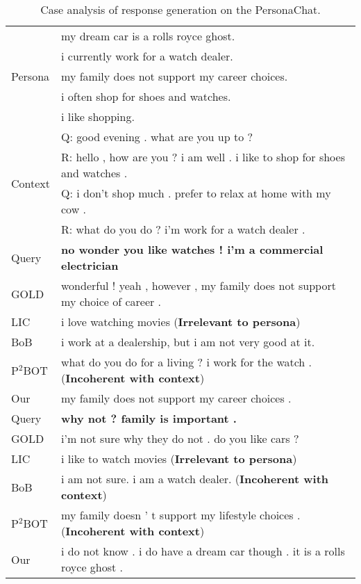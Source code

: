 \documentclass[letterpaper]{article} \usepackage{aaai23}  \usepackage{times}  \usepackage{helvet}  \usepackage{courier}  \usepackage[hyphens]{url}  \usepackage{graphicx} \urlstyle{rm} \def\UrlFont{\rm}  \usepackage{natbib}  \usepackage{caption} \frenchspacing  \setlength{\pdfpagewidth}{8.5in}  \setlength{\pdfpageheight}{11in}  \usepackage{algorithm}
\begin{document}
\begin{table*}[ht]
  \centering
    \begin{tabular}{ll}
    \toprule
    \multirow{5}{*}{Persona} & my dream car is a rolls royce ghost. \\
    ~ & i currently work for a watch dealer.\\
    ~ & my family does not support my career choices. \\
    ~ & i often shop for shoes and watches. \\
    ~ & i like shopping. \\
    \midrule
    \multirow{4}{*}{Context} & Q: good evening . what are you up to ? \\
    ~ & R: hello , how are you ? i am well . i like to shop for shoes and watches . \\
    ~ & Q: i don't shop much . prefer to relax at home with my cow . \\
    ~ & R: what do you do ? i'm work for a watch dealer . \\
   \bottomrule
    \toprule
    Query & \textbf{no wonder you like watches ! i'm a commercial electrician} \\
\midrule   GOLD  & wonderful ! yeah , however , my family does not support my choice of career .\\
\midrule   LIC   & i love watching movies (\textbf{Irrelevant to persona})\\
\midrule    BoB   &  i work at a dealership, but i am not very good at it.\\
\midrule   P$^2$BOT & what do you do for a living ? i work for the watch . (\textbf{Incoherent with context})\\
\midrule    Our   & my family does not support my career choices . \\
\bottomrule
\toprule    Query & \textbf{why not ? family is important .} \\
\midrule   GOLD  & i'm not sure why they do not . do you like cars ? \\
\midrule  LIC   & i like to watch movies (\textbf{Irrelevant to persona})\\
\midrule   BoB   &  i am not sure. i am a watch dealer. (\textbf{Incoherent with context})\\
\midrule    P$^2$BOT & my family doesn ' t support my lifestyle choices . (\textbf{Incoherent with context})\\
\midrule    Our   & i do not know . i do have a dream car though . it is a rolls royce ghost .\\
\bottomrule    \end{tabular}\caption{Case analysis of response generation on the PersonaChat.}
\label{table9}\end{table*}
\end{document}
